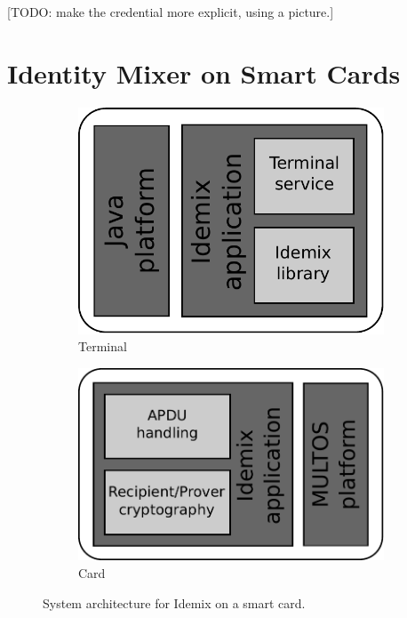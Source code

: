 [TODO: make the credential more explicit, using a picture.]

\section{Identity Mixer on Smart Cards}

\begin{figure}[h]
  \centering
  \begin{subfigure}{0.45\textwidth}
    \includegraphics[scale=.45]{images/idemix-terminal-architecture}
    \caption{Terminal}
    \label{fig:terminal-architecture}
  \end{subfigure}
  \qquad
  \begin{subfigure}{0.45\textwidth}
    \includegraphics[scale=.45]{images/idemix-card-architecture}
    \caption{Card}
    \label{fig:card-architecture}
  \end{subfigure}
  \caption{System architecture for Idemix on a smart card.}
  \label{fig:architecture}
\end{figure}

